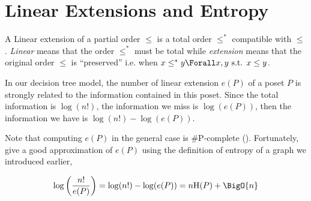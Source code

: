 \section{Linear Extensions and Entropy}

A Linear extension of a partial order $\leq$ is a total order $\leq^*$
compatible with $\leq$. \emph{Linear} means that the order $\leq^*$ must be
total while \emph{extension} means that the original order $\leq$ is
``preserved'' i.e. when $x \leq^* y \Forall x, y\text{ s.t. }x \leq y$.

In our decision tree model, the number of linear extension $e(P)$ of a poset
$P$ is strongly related to the information contained in this poset. Since the
total information is $\log(n!)$, the information we miss is $\log(e(P))$, then
the information we have is $\log(n!) - \log(e(P))$.


Note that computing $e(P)$ in the general case is \#P-complete
(\cite{brightwell1991counting}). Fortunately, \cite{kahnkim1} give a good
approximation of $e(P)$ using the definition of entropy of a graph we
introduced earlier,

\begin{equation}
\log\left(\frac{n!}{e(P)}\right) = \log(n!) - \log(e(P)) = n \text{H}(P) + \BigO{n}
\label{eq:khankim1}
\end{equation}
